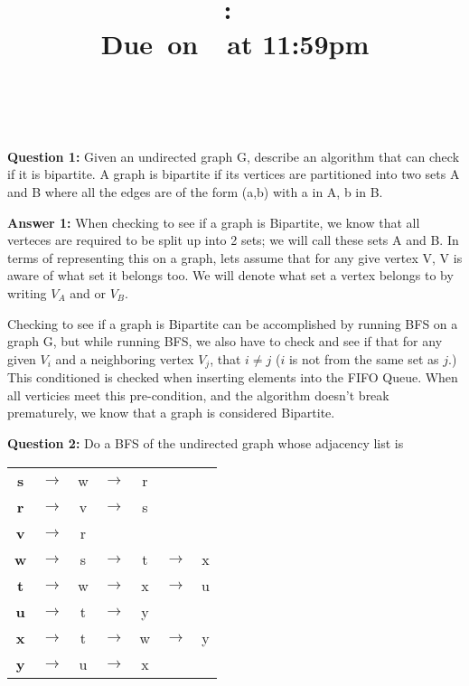 \documentclass{article}
\title{
    \vspace{2in}
    \textmd{\textbf{\hmwkClass:\ \hmwkTitle}}\\
    \normalsize\vspace{0.1in}\small{Due\ on\ \hmwkDueDate\ at 11:59pm}\\
    \vspace{0.1in}\large{\textit{\hmwkClassInstructor\ \hmwkClassTime}}
    \vspace{3in}
}
\author{\hmwkAuthorName}
\date{}
\begin{document}
\maketitle
\pagebreak


	\textbf{Question 1: }Given an undirected graph G, describe an algorithm that can check if it is bipartite. A graph is bipartite if its vertices are partitioned into two sets A and B where all the edges are of the form (a,b) with a in A, b in B.
	
	\textbf{Answer 1: }When checking to see if a graph is Bipartite, we know that all verteces are required to be split up into 2 sets; we will call these sets A and B. In terms of representing this on a graph, lets assume that for any give vertex V, V is aware of what set it belongs too. We will denote what set a vertex belongs to by writing $V_A$ and or $V_B$. 
	
Checking to see if a graph is Bipartite can be accomplished by running BFS on a graph G, but while running BFS, we also have to check and see if that for any given $V_i$ and a neighboring vertex $V_j$, that $i \neq j$ ($i$ is not from the same set as $j$.) This conditioned is checked when inserting elements into the FIFO Queue. When all verticies meet this pre-condition, and the algorithm doesn't break prematurely, we know that a graph is considered Bipartite. 


	\newpage
	
	\textbf{Question 2: } Do a BFS of the undirected graph whose adjacency list is
	
		\begin{center}
			\begin{tabular}{c c c c c c c}
				\textbf{s} &$\rightarrow$ &w &$\rightarrow$ &r &     &   		\\
				\textbf{r} &$\rightarrow$ &v &$\rightarrow$ &s &     &   		\\
				\textbf{v} &$\rightarrow$ &r &     &  &     &   					\\
				\textbf{w} &$\rightarrow$ &s &$\rightarrow$ &t &$\rightarrow$ &x	\\
				\textbf{t} &$\rightarrow$ &w &$\rightarrow$ &x &$\rightarrow$ &u	\\
				\textbf{u} &$\rightarrow$ &t &$\rightarrow$ &y &     &   		\\
				\textbf{x} &$\rightarrow$ &t &$\rightarrow$ &w &$\rightarrow$ &y	\\
				\textbf{y} &$\rightarrow$ &u &$\rightarrow$ &x &     &   		\\
			\end{tabular}
		\end{center}
		
\end{document}
